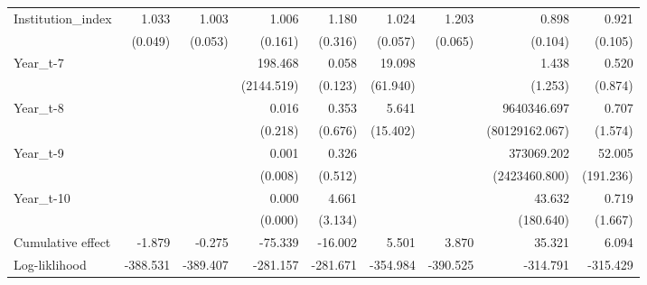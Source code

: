 \begin{table}[htbp]
\begin{tabular}{l*{8}{D{.}{.}{-1}}}
Institution\_index&       1.033         &       1.003         &       1.006         &       1.180         &       1.024         &       1.203\sym{***}&       0.898         &       0.921         \\
            &     (0.049)         &     (0.053)         &     (0.161)         &     (0.316)         &     (0.057)         &     (0.065)         &     (0.104)         &     (0.105)         \\
Year\_t-7    &                     &                     &     198.468         &       0.058         &      19.098         &                     &       1.438         &       0.520         \\
            &                     &                     &  (2144.519)         &     (0.123)         &    (61.940)         &                     &     (1.253)         &     (0.874)         \\
Year\_t-8    &                     &                     &       0.016         &       0.353         &       5.641         &                     & 9640346.697\sym{*}  &       0.707         \\
            &                     &                     &     (0.218)         &     (0.676)         &    (15.402)         &                     &(80129162.067)         &     (1.574)         \\
Year\_t-9    &                     &                     &       0.001         &       0.326         &                     &                     &  373069.202\sym{**} &      52.005         \\
            &                     &                     &     (0.008)         &     (0.512)         &                     &                     &(2423460.800)         &   (191.236)         \\
Year\_t-10   &                     &                     &       0.000\sym{**} &       4.661\sym{**} &                     &                     &      43.632         &       0.719         \\
            &                     &                     &     (0.000)         &     (3.134)         &                     &                     &   (180.640)         &     (1.667)         \\
\midrule
Cumulative effect&      -1.879         &      -0.275         &     -75.339         &     -16.002         &       5.501         &       3.870         &      35.321         &       6.094         \\
 Log-liklihood&    -388.531         &    -389.407         &    -281.157         &    -281.671         &    -354.984         &    -390.525         &    -314.791         &    -315.429         \\

\end{tabular}
\end{table}

